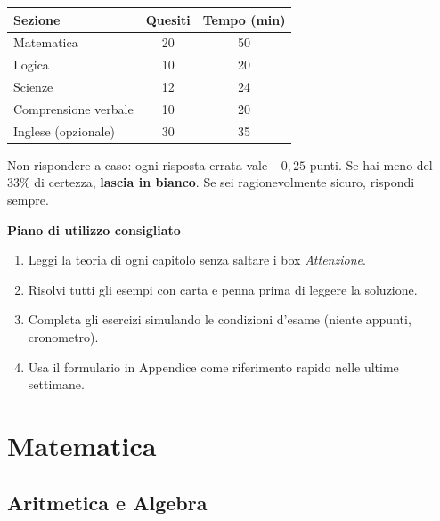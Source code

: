 \documentclass[12pt, a4paper, twoside, openright]{book}
\theoremstyle{definition}
\begin{document}
\begin{center}
\begin{tabular}{lcc}
\toprule
\textbf{Sezione} & \textbf{Quesiti} & \textbf{Tempo (min)} \\
\midrule
Matematica & 20 & 50 \\
Logica & 10 & 20 \\
Scienze & 12 & 24 \\
Comprensione verbale & 10 & 20 \\
Inglese (opzionale) & 30 & 35 \\
\bottomrule
\end{tabular}
\end{center}

\medskip
\begin{attenzione}
Non rispondere a caso: ogni risposta errata vale $-0{,}25$ punti.
Se hai meno del 33\% di certezza, \textbf{lascia in bianco}.
Se sei ragionevolmente sicuro, rispondi sempre.
\end{attenzione}

\medskip
\noindent\textbf{Piano di utilizzo consigliato}

\begin{enumerate}
  \item Leggi la teoria di ogni capitolo senza saltare i box \emph{Attenzione}.
  \item Risolvi tutti gli esempi con carta e penna prima di leggere la soluzione.
  \item Completa gli esercizi simulando le condizioni d'esame (niente appunti, cronometro).
  \item Usa il formulario in Appendice come riferimento rapido nelle ultime settimane.
\end{enumerate}

\mainmatter

\part{Matematica}

\chapter{Aritmetica e Algebra}
\end{document}
